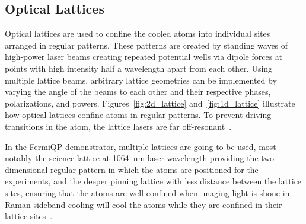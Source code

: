 \subsection*{Optical Lattices}\label{ch:optical_lattices}
Optical lattices are used to confine the cooled atoms into individual sites arranged in regular patterns. These patterns are created by standing waves of high-power laser beams creating repeated potential wells via dipole forces at points with high intensity  half a wavelength apart from each other. Using multiple lattice beams, arbitrary lattice geometries can be implemented by varying the angle of the beams to each other and their respective phases, polarizations, and powers. Figures~\ref{fig:2d_lattice} and~\ref{fig:1d_lattice} illustrate how optical lattices confine atoms in regular patterns. To prevent driving transitions in the atom, the lattice lasers are far off-resonant~\cite{bloch_many-body_2008, bloch_quantum_2012}.

In the FermiQP demonstrator, multiple lattices are going to be used, most notably the science lattice at \SI[]{1064}{\nano\meter} laser wavelength providing the two-dimensional regular pattern in which the atoms are positioned for the experiments, and the deeper pinning lattice with less distance between the lattice sites, ensuring that the atoms are well-confined when imaging light is shone in. Raman sideband cooling will cool the atoms while they are confined in their lattice sites~\cite{hilker_spin-resolved_2017, krumm_notitle_2022}.

